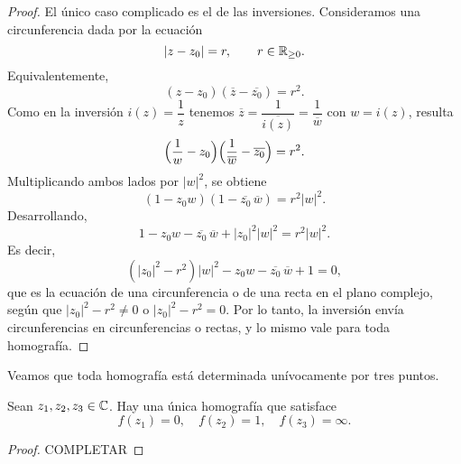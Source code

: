 \begin{proof}
    El único caso complicado es el de las inversiones. Consideramos una circunferencia dada por la ecuación
    \begin{equation*}
        |z - z_0| = r, \qquad r \in \mathbb{R}_{\geq 0}.
    \end{equation*}
    Equivalentemente,
    \begin{equation*}
        (z - z_0)(\overline{z} - \overline{z_0}) = r^2.
    \end{equation*}
    Como en la inversión $i(z)=\dfrac{1}{z}$ tenemos $\overline{z}=\dfrac{1}{\overline{i(z)}}=\dfrac{1}{\overline{w}}$ con $w=i(z)$, resulta
    \begin{equation*}
        \Bigl(\frac{1}{w}-z_0\Bigr)\Bigl(\frac{1}{\overline{w}}-\overline{z_0}\Bigr)=r^2.
    \end{equation*}
    Multiplicando ambos lados por $|w|^2$, se obtiene
    \begin{equation*}
        (1-z_0w)(1-\overline{z_0}\,\overline{w})=r^2|w|^2.
    \end{equation*}
    Desarrollando,
    \begin{equation*}
        1 - z_0 w - \overline{z_0}\,\overline{w} + |z_0|^2 |w|^2 = r^2 |w|^2.
    \end{equation*}
    Es decir,
    \begin{equation*}
        (|z_0|^2-r^2)|w|^2 - z_0 w - \overline{z_0}\,\overline{w} + 1 = 0,
    \end{equation*}
    que es la ecuación de una circunferencia o de una recta en el plano complejo, según que $|z_0|^2-r^2\neq 0$ o $|z_0|^2-r^2=0$. 
    Por lo tanto, la inversión envía circunferencias en circunferencias o rectas, y lo mismo vale para toda homografía.
\end{proof}

Veamos que toda homografía está determinada unívocamente por tres puntos.

\begin{proposition}
    Sean $z_1, z_2, z_3 \in \mathbb{C}$. Hay una única homografía que satisface
    \begin{equation*}
        f(z_1) = 0, \quad f(z_2) = 1, \quad f(z_3) = \infty.
    \end{equation*}
\end{proposition}

\begin{proof}
    {\color{red} COMPLETAR}
\end{proof}
